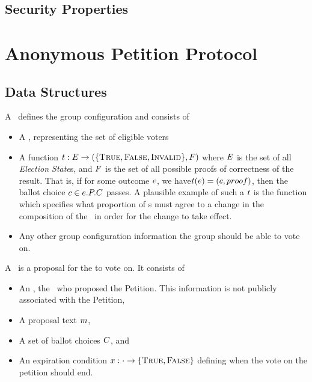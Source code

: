 \subsection{Security Properties}

\section{Anonymous Petition Protocol}
\subsection{Data Structures}
  A \KwManifest~defines the group configuration and consists of
  \begin{itemize}
    \item A \KwRoster, representing the set of eligible voters
    \item A function $t : E \to (\{\textsc{True}, \textsc{False}, \textsc{Invalid}\}, F)$
      where $E$ is the set of all \emph{Election State}s, and
      $F$ is the set of all possible proofs of correctness of the result.
      That is, if for some outcome $e$, we
      have$t(e) = (c, proof)$, then the ballot
      choice $c \in e.P.C$ passes.  A
      plausible example of such a $t$ is the function which specifies
      what proportion of \KwPeer s must agree to a change in the composition of
      the \KwRoster~in order for the change to take effect.
    \item Any other group configuration information the group should be able to
      vote on.
  \end{itemize}

  A \StructPetition~is a proposal for the \KwCluster to vote on. It consists of
    \begin{itemize}
      \item An \StructInstigator, the \KwPeer~who proposed the
        Petition. This information is not publicly associated with
        the Petition,
      \item A proposal text $m$,
      \item A set of ballot choices $C$, and
      \item An expiration condition $x : \cdot \to \{\textsc{True},
        \textsc{False}\}$ defining when the vote on the petition should end.
   \end{itemize}

